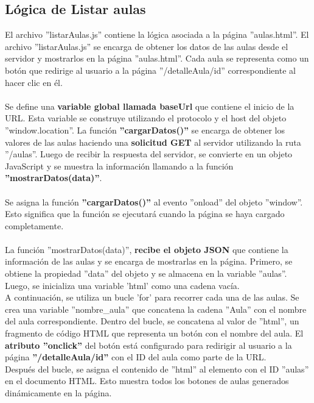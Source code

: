 \documentclass[12pt]{report}
\begin{document}
\subsection{Lógica de Listar aulas}
El archivo ''listarAulas.js'' contiene la lógica asociada a la página ''aulas.html''. El archivo ''listarAulas.js'' se encarga de obtener los datos de las aulas desde el servidor y mostrarlos en la página ''aulas.html''. Cada aula se representa como un botón que redirige al usuario a la página ''/detalleAula/id'' correspondiente al hacer clic en él.
\\\\
Se define una \textbf{variable global llamada baseUrl} que contiene el inicio de la URL. Esta variable se construye utilizando el protocolo y el host del objeto ''window.location''.
La función \textbf{''cargarDatos()''} se encarga de obtener los valores de las aulas haciendo una \textbf{solicitud GET} al servidor utilizando la ruta ''/aulas''. Luego de recibir la respuesta del servidor, se convierte en un objeto JavaScript y se muestra la información llamando a la función \textbf{''mostrarDatos(data)''}.
\\\\
Se asigna la función \textbf{''cargarDatos()''} al evento ''onload'' del objeto ''window''. Esto significa que la función se ejecutará cuando la página se haya cargado completamente.
\\\\La función ''mostrarDatos(data)'', \textbf{recibe el objeto JSON} que contiene la información de las aulas y se encarga de mostrarlas en la página. Primero, se obtiene la propiedad ''data'' del objeto y se almacena en la variable ''aulas''. Luego, se inicializa una variable 'html' como una cadena vacía.
\\
A continuación, se utiliza un bucle 'for' para recorrer cada una de las aulas. Se crea una variable ''nombre\_aula'' que concatena la cadena ''Aula'' con el nombre del aula correspondiente.
Dentro del bucle, se concatena al valor de ''html'', un fragmento de código HTML que representa un botón con el nombre del aula. El \textbf{atributo ''onclick''} del botón está configurado para redirigir al usuario a la página \textbf{''/detalleAula/id''} con el ID del aula como parte de la URL.
\\
Después del bucle, se asigna el contenido de ''html'' al elemento con el ID ''aulas'' en el documento HTML. Esto muestra todos los botones de aulas generados dinámicamente en la página.
\end{document}
